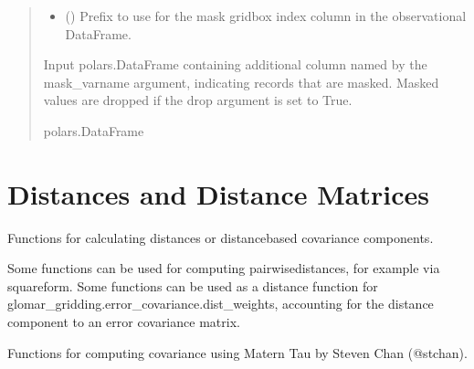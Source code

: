 \documentclass[letterpaper,10pt,english]{sphinxmanual}
\begin{document}
\begin{fulllineitems}
\begin{quote}
\begin{description}
\begin{itemize}
\item {}
\sphinxAtStartPar
{} () \textendash{} Prefix to use for the mask gridbox index column in the observational
DataFrame.

\end{itemize}

\sphinxAtStartPar
{} \textendash{} Input polars.DataFrame containing additional column named by the
mask\_varname argument, indicating records that are masked. Masked values
are dropped if the drop argument is set to True.

\sphinxAtStartPar
polars.DataFrame

\end{description}\end{quote}

\end{fulllineitems}



\section{Distances and Distance Matrices}
\label{\detokenize{misc:module-glomar_gridding.distances}}\label{\detokenize{misc:distances-and-distance-matrices}}
\sphinxAtStartPar
Functions for calculating distances or distance\sphinxhyphen{}based covariance components.

\sphinxAtStartPar
Some functions can be used for computing pairwise\sphinxhyphen{}distances, for example via
squareform. Some functions can be used as a distance function for
glomar\_gridding.error\_covariance.dist\_weights, accounting for the distance
component to an error covariance matrix.

\sphinxAtStartPar
Functions for computing covariance using Matern Tau by Steven Chan (@stchan).
\end{document}
